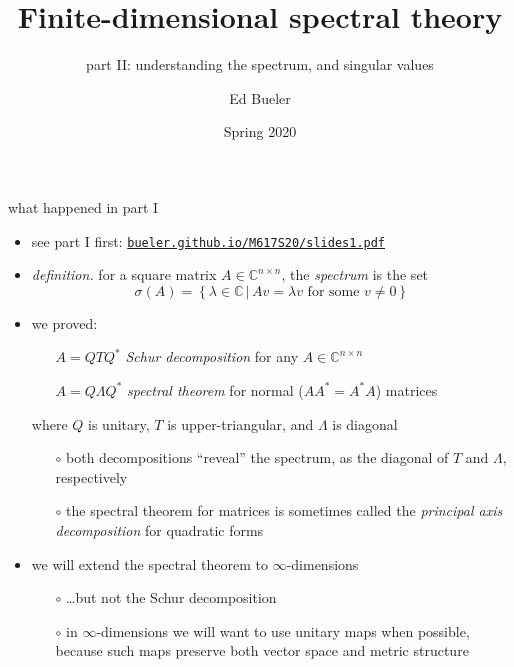 \documentclass[10pt,hyperref]{beamer}
\title[Finite-dimensional spectral theory II]{Finite-dimensional spectral theory}
\subtitle{part II: understanding the spectrum, and singular values}
\author{Ed Bueler}
\institute[MATH 617]{MATH 617 Functional Analysis}
\date{Spring 2020}
\newcommand{\CC}{\mathbb{C}}
\begin{document}
\beamertemplatenavigationsymbolsempty


\begin{frame}
  \maketitle
\end{frame}


\begin{frame}{what happened in part I}

\begin{itemize}
\item see part I first: \quad \href{http://bueler.github.io/M617S20/slides1.pdf}{\texttt{bueler.github.io/M617S20/slides1.pdf}}
\item \emph{definition.} for a square matrix $A\in\CC^{n\times n}$, the \emph{spectrum} is the set
    $$\sigma(A)=\left\{\lambda\in\CC\,\big|\,Av=\lambda v \text{ for some }v\ne 0\right\}$$
\item we proved:
    \begin{itemize}
    \item[] $A = Q T Q^*$ \quad \emph{Schur decomposition} \quad for any $A \in \CC^{n\times n}$
    \item[] $A = Q \Lambda Q^*$ \quad \emph{spectral theorem} \quad for normal ($AA^*=A^*A$) matrices
    \end{itemize}
where $Q$ is unitary, $T$ is upper-triangular, and $\Lambda$ is diagonal
    \begin{itemize}
    \item[$\circ$] both decompositions ``reveal'' the spectrum, as the diagonal of $T$ and $\Lambda$, respectively
    \item[$\circ$] the spectral theorem for matrices is sometimes called the \emph{principal axis decomposition} for quadratic forms
    \end{itemize}
\item we will extend the spectral theorem to $\infty$-dimensions
    \begin{itemize}
    \item[$\circ$] \dots but not the Schur decomposition
    \item[$\circ$] in $\infty$-dimensions we will want to use unitary maps when possible, because such maps preserve both vector space and metric structure
    \end{itemize}
\end{itemize}
\end{frame}
\end{document}

